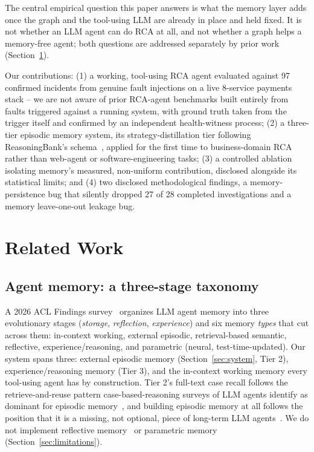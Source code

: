\documentclass[conference]{IEEEtran}
\begin{document}
The central empirical question this paper answers is what the memory layer adds once the graph and the
tool-using LLM are already in place and held fixed. It is not whether an LLM agent can do RCA at all, and not
whether a graph helps a memory-free agent; both questions are addressed separately by prior work
(Section~\ref{sec:related}).

Our contributions: (1) a working, tool-using RCA agent evaluated against 97 confirmed incidents from genuine fault
injections on a live 8-service payments stack -- we are not aware of prior RCA-agent benchmarks built entirely
from faults triggered against a running system, with ground truth taken from the trigger itself and confirmed by
an independent health-witness process; (2) a three-tier episodic memory system, its strategy-distillation tier
following ReasoningBank's schema~\cite{reasoningbank}, applied for the first time to business-domain RCA rather
than web-agent or software-engineering tasks; (3) a controlled ablation isolating memory's measured,
non-uniform contribution, disclosed alongside its statistical limits; and (4) two disclosed methodological
findings, a memory-persistence bug that silently dropped 27 of 28 completed investigations and a memory
leave-one-out leakage bug.

\section{Related Work}
\label{sec:related}

\subsection{Agent memory: a three-stage taxonomy}

A 2026 ACL Findings survey~\cite{survey2026} organizes LLM agent memory into three evolutionary stages
(\emph{storage}, \emph{reflection}, \emph{experience}) and six memory \emph{types} that cut across them:
in-context working, external episodic, retrieval-based semantic, reflective, experience/reasoning, and
parametric (neural, test-time-updated). Our system spans three: external episodic memory
(Section~\ref{sec:system}, Tier 2), experience/reasoning memory (Tier 3), and the in-context working memory
every tool-using agent has by construction. Tier 2's full-text case recall follows the retrieve-and-reuse
pattern case-based-reasoning surveys of LLM agents identify as dominant for episodic memory~\cite{cbrsurvey},
and building episodic memory at all follows the position that it is a missing, not optional, piece of
long-term LLM agents~\cite{episodicposition}. We do not implement reflective memory~\cite{rmm} or parametric
memory (Section~\ref{sec:limitations}).
\end{document}
